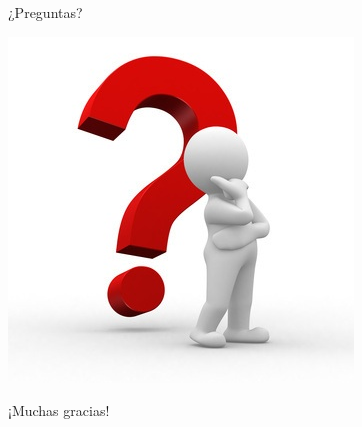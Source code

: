 \documentclass[pdf]{beamer}
\begin{document}
\begin{frame}
    \huge{¿Preguntas?}
    \begin{center}
        \includegraphics[scale=0.4]{img/question-mark.jpg}
    \end{center}
    \large{¡Muchas gracias!}
\end{frame}
\end{document}
